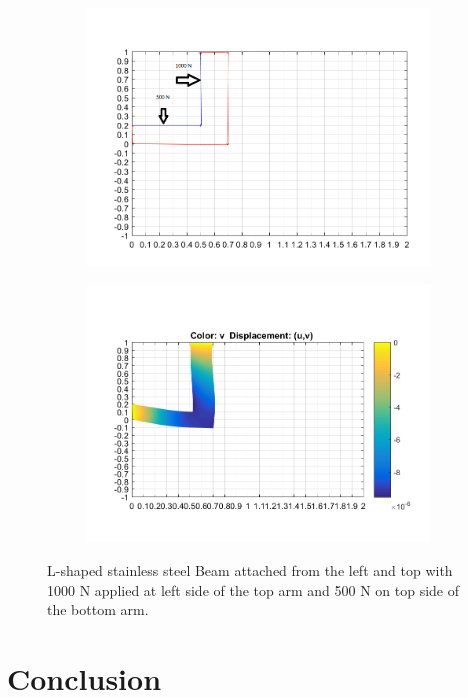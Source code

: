 \documentclass[12pt]{article}
\begin{document}
\begin{figure}[H]
	\centering
	\begin{subfigure}[b]{0.8\textwidth}   
		\centering 
		\includegraphics[width=\textwidth]{5}  
	\end{subfigure}
	\begin{subfigure}[b]{0.8\textwidth}   
		\centering 
		\includegraphics[width=\textwidth]{6}
	\end{subfigure}
\caption{L-shaped stainless steel Beam attached from the left and top with 1000 N applied at left side of the top arm and 500 N on top side of the bottom arm.}
\label{elo}
\end{figure}

\section{Conclusion}
\end{document}
